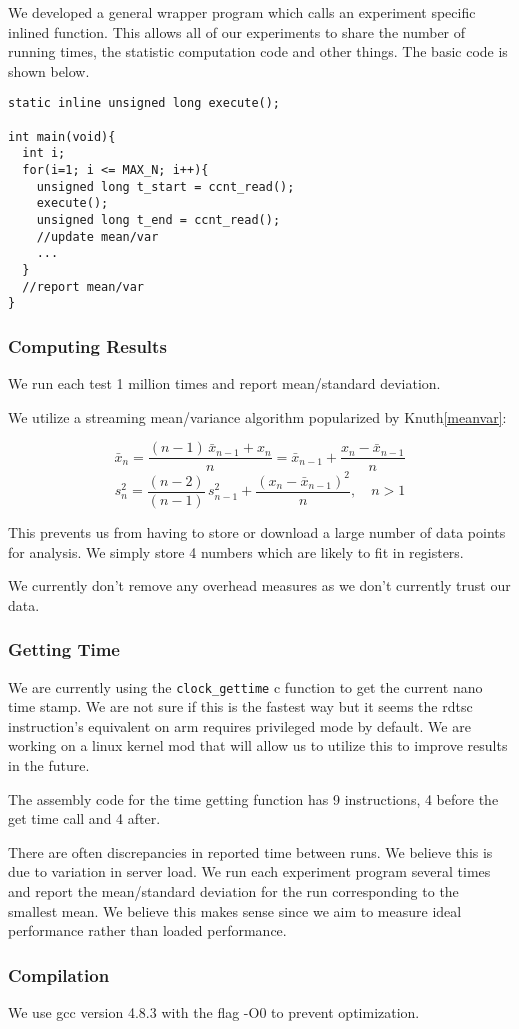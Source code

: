
We developed a general wrapper program which calls an experiment specific inlined function.
This allows all of our experiments to share the number of running times, the statistic computation code and other things.
The basic code is shown below.

\begin{verbatim}
static inline unsigned long execute();

int main(void){
  int i;
  for(i=1; i <= MAX_N; i++){
    unsigned long t_start = ccnt_read();
    execute();
    unsigned long t_end = ccnt_read();
    //update mean/var
    ...
  }
  //report mean/var
}
\end{verbatim}

\subsubsection{Computing Results}

We run each test 1 million times and report mean/standard deviation.

We utilize a streaming mean/variance algorithm popularized by Knuth\ref{meanvar}:

$$\bar x_n = \frac{(n-1) \, \bar x_{n-1} + x_n}{n} = \bar x_{n-1} + \frac{x_n - \bar x_{n-1}}{n} \!$$
$$s^2_n = \frac{(n-2)}{(n-1)} \, s^2_{n-1} + \frac{(x_n - \bar x_{n-1})^2}{n}, \quad n>1 $$

This prevents us from having to store or download a large number of data points for analysis.  We simply store 4 numbers which are likely to fit in registers.

We currently don't remove any overhead measures as we don't currently trust our data.

\subsubsection{Getting Time}
We are currently using the {\tt clock\_gettime} c function to get the current nano time stamp.
We are not sure if this is the fastest way but it seems the rdtsc instruction's equivalent on arm requires privileged mode by default.
We are working on a linux kernel mod that will allow us to utilize this to improve results in the future.

The assembly code for the time getting function has 9 instructions, 4 before the get time call and 4 after.  

There are often discrepancies in reported time between runs.  We believe this is due to variation in server load.  
We run each experiment program several times and report the mean/standard deviation for the run corresponding to the smallest mean.  We believe this makes sense since we aim to measure ideal performance rather than loaded performance.  

\subsubsection{Compilation}
We use gcc version 4.8.3 with the flag -O0 to prevent optimization.